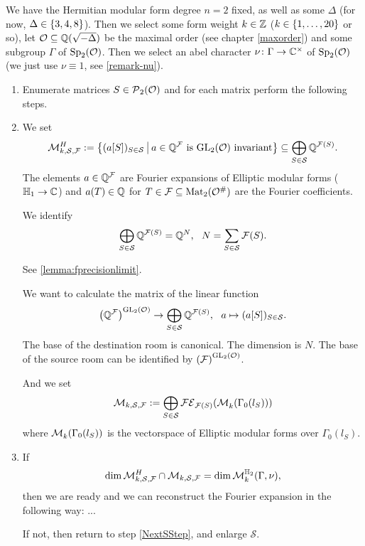 \begin{algo}
\label{main-algo}
We have the Hermitian modular form degree $n = 2$ fixed, as well as some $\Delta$ (for now, $\Delta \in \Set{3,4,8}$). Then we select some form weight $k \in \mathbb{Z}$ ($k \in \Set{1,\dots,20}$ or so), let $\mathcal{O} \subseteq \mathbb{Q}(\sqrt{-\Delta})$ be the maximal order (see chapter \ref{maxorder}) and some subgroup $\Gamma$ of $\operatorname{Sp}_2(\mathcal{O})$. Then we select an abel character $\nu \colon \Gamma \rightarrow \mathbb{C}^\times$ of $\operatorname{Sp}_2(\mathcal{O})$ (we just use $\nu \equiv 1$, see \cref{remark-nu}).

\begin{enumerate}
\item\label{NextSStep} Enumerate matrices $S \in \operatorname{\mathcal{P}}_2(\mathcal{O})$ and for each matrix perform the following steps.


\item
We set
\[ \mathcal{M}_{k,\mathcal{S},\F}^H := \Set{ (a [S])_{S\in\mathcal{S}} }{\text{$a \in \Q^\F$ is $\GL_2(\curlO)$ invariant}} \subseteq \bigoplus_{S\in\mathcal{S}} \Q^{\FPrecisionLimit{S}} . \]
The elements $a \in \mathbb{Q}^{\mathcal{F}}$ are Fourier expansions of Elliptic modular forms ($\mathbb{H}_1 \rightarrow \mathbb{C}$) and $a(T) \in \mathbb{Q}$ for $T \in \mathcal{F} \subseteq \operatorname{Mat}_2(\mathcal{O}^\#)$ are the Fourier coefficients.

We identify
\[ \bigoplus_{S\in\mathcal{S}} \mathbb{Q}^{\mathcal{F}(S)} = \mathbb{Q}^N, \ \ N = \sum_{S\in\mathcal{S}} \mathcal{F}(S) . \]

See \cref{lemma:fprecisionlimit}.

We want to calculate the matrix of the linear function \[
\invar{\Q^\F}{\GL_2(\curlO)} \rightarrow \bigoplus_{S\in\mathcal{S}} \Q^{\FPrecisionLimit{S}}, \ \ 
a \mapsto (a[S])_{S\in\mathcal{S}} .
\]
The base of the destination room is canonical. The dimension is $N$.
The base of the source room can be identified by ${\left(\mathcal{F}\right)}^{\operatorname{GL}_2(\mathcal{O})}$.

And we set
\[ \mathcal{M}_{k, \mathcal{S},\mathcal{F}} := \bigoplus_{S\in\mathcal{S}} \mathcal{FE}_{\mathcal{F}(S)}(\operatorname{\mathcal{M}}^{}_k (\Gamma_0(l_S))) \]
where $\operatorname{\mathcal{M}}^{}_k (\Gamma_0(l_S))$ is the vectorspace of Elliptic modular forms over $\Gamma_0(l_S)$. %

\item
If
\[ \dim \mathcal{M}_{k,\mathcal{S},\mathcal{F}}^H \cap \mathcal{M}_{k, \mathcal{S},\mathcal{F}}
= \dim \operatorname{\mathcal{M}}^{\mathbb{H}_{2}}_k (\Gamma,\nu) , \]
then we are ready and we can reconstruct the Fourier expansion in the following way: ...

If not, then return to step \ref{NextSStep}, and enlarge $\mathcal{S}$.
\end{enumerate}
\end{algo}

